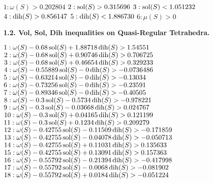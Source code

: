 $1:  \omega(S) > 0.202804$\newline
$2:  \operatorname{sol}(S) > 0.315696$\newline
$3:  \operatorname{sol}(S) < 1.051232$\newline
$4:  \operatorname{dih}(S) > 0.856147$\newline
$5:  \operatorname{dih}(S) < 1.886730$\newline
$6:  \mu(S) > 0$\newline


\smallskip

{\bf 1.2. Vol, Sol, Dih inequalities on Quasi-Regular Tetrahedra.}

\smallskip

$1:  \omega(S) - 0.68 \operatorname{sol}(S) + 1.88718 \operatorname{dih}(S) > 1.54551 $\newline
$2:  \omega(S) - 0.68 \operatorname{sol}(S) + 0.90746 \operatorname{dih}(S) > 0.706725$\newline
$3:  \omega(S) - 0.68 \operatorname{sol}(S) + 0.46654 \operatorname{dih}(S) > 0.329233$\newline
$4:  \omega(S) - 0.55889 \operatorname{sol}(S) - 0 \operatorname{dih}(S) > -0.0736486$\newline
$5:  \omega(S) - 0.63214 \operatorname{sol}(S) - 0 \operatorname{dih}(S) > -0.13034$\newline
$6:  \omega(S) - 0.73256 \operatorname{sol}(S) - 0 \operatorname{dih}(S) > -0.23591$\newline
$7:  \omega(S) - 0.89346 \operatorname{sol}(S) - 0 \operatorname{dih}(S) > -0.40505$\newline
$8:  \omega(S) - 0.3 \operatorname{sol}(S) - 0.5734 \operatorname{dih}(S) > -0.978221$\newline
$9:  \omega(S) - 0.3 \operatorname{sol}(S) - 0.03668 \operatorname{dih}(S) > 0.024767$\newline
$10:  \omega(S) - 0.3 \operatorname{sol}(S) + 0.04165 \operatorname{dih}(S) > 0.121199$\newline
$11:  \omega(S) - 0.3 \operatorname{sol}(S) + 0.1234 \operatorname{dih}(S) > 0.209279$\newline
$12:  \omega(S) - 0.42755 \operatorname{sol}(S) - 0.11509 \operatorname{dih}(S) > -0.171859$\newline
$13:  \omega(S) - 0.42755 \operatorname{sol}(S) - 0.04078 \operatorname{dih}(S) > -0.050713$\newline
$14:  \omega(S) - 0.42755 \operatorname{sol}(S) + 0.11031 \operatorname{dih}(S) > 0.135633$\newline
$15:  \omega(S) - 0.42755 \operatorname{sol}(S) + 0.13091 \operatorname{dih}(S) > 0.157363$\newline
$16:  \omega(S) - 0.55792 \operatorname{sol}(S) - 0.21394 \operatorname{dih}(S) > -0.417998$\newline
$17:  \omega(S) - 0.55792 \operatorname{sol}(S) - 0.0068 \operatorname{dih}(S) > -0.081902$\newline
$18:  \omega(S) - 0.55792 \operatorname{sol}(S) + 0.0184 \operatorname{dih}(S) > -0.051224$\newline
